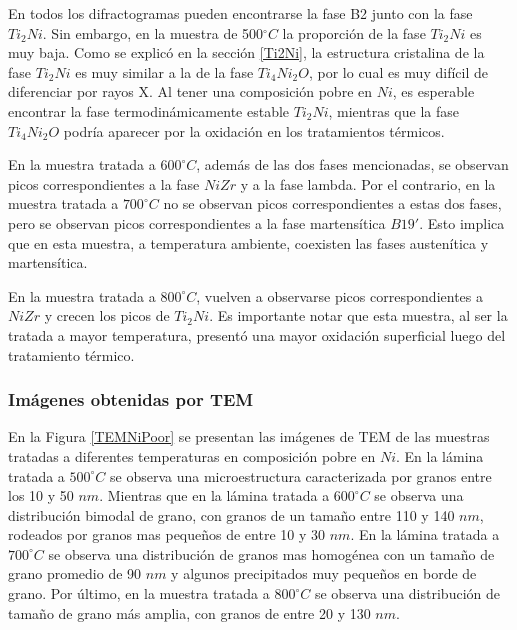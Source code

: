 \documentclass[12pt]{article}
\theoremstyle{definition}
\theoremstyle{remark}
\begin{document}
{En todos los difractogramas pueden encontrarse la fase B2 junto con la fase $Ti_2Ni$. Sin embargo, en la muestra de 500$^\circ C$ la proporción de la fase $Ti_2 Ni$ es muy baja. Como se explicó en la sección \ref{Ti2Ni}, la estructura cristalina de la fase $Ti_2 Ni$ es muy similar a la de la fase $Ti_4Ni_2O$, por lo cual es muy difícil de diferenciar por rayos X. Al tener una composición pobre en $Ni$, es esperable encontrar la fase termodinámicamente estable $Ti_2 Ni$, mientras que la fase $Ti_4Ni_2O$ podría aparecer por la oxidación en los tratamientos térmicos.

En la muestra tratada a $600 ^\circ C$, además de las dos fases mencionadas, se observan picos correspondientes a la fase $NiZr$ y a la fase lambda. Por el contrario, en la muestra tratada a $700 ^\circ C$ no se observan picos correspondientes a estas dos fases, pero se observan picos correspondientes a la fase martensítica $B19'$. Esto implica que en esta muestra, a temperatura ambiente, coexisten las fases austenítica y martensítica.

En la muestra tratada a $800 ^\circ C$, vuelven a observarse picos correspondientes a $NiZr$ y crecen los picos de $Ti_2 Ni$. Es importante notar que esta muestra, al ser la tratada a mayor temperatura, presentó una mayor oxidación superficial luego del tratamiento térmico. 


\subsubsection{Imágenes obtenidas por TEM}
\label{TemNiPoorResults}

En la Figura \ref{TEMNiPoor} se presentan las imágenes de TEM de las muestras tratadas a diferentes temperaturas en composición pobre en $Ni$. En la lámina tratada a $500 ^\circ C$ se observa una microestructura caracterizada por granos entre los 10 y 50 $nm$. Mientras que en la lámina tratada a $600 ^\circ C$ se observa una distribución bimodal de grano, con granos de un tamaño entre 110 y 140 $nm$, rodeados por granos mas pequeños de entre 10 y 30 $nm$. En la lámina tratada a $700 ^\circ C$ se observa una distribución de granos mas homogénea con un tamaño de grano promedio de 90 $nm$ y algunos precipitados muy pequeños en borde de grano. Por último, en la muestra tratada a $800 ^\circ C$ se observa una distribución de tamaño de grano más amplia, con granos de entre 20 y 130 $nm$.

}
\end{document}
